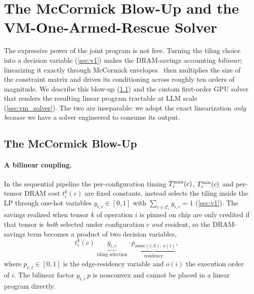 \section{The McCormick Blow-Up and the VM-One-Armed-Rescue Solver}
\label{sec:solver_vm}

The expressive power of the joint program is not free. Turning the tiling
choice into a decision variable (\cref{sec:v1}) makes the DRAM-savings
accounting \emph{bilinear}; linearizing it exactly through McCormick
envelopes~\citep{mccormick1976computability} then multiplies the size of the
constraint matrix and drives its conditioning across roughly ten orders of
magnitude. We describe this blow-up (\cref{sec:mccormick_blowup}) and the
custom first-order GPU solver that renders the resulting linear program
tractable at LLM scale (\cref{sec:vm_solver}). The two are inseparable: we
adopt the exact linearization \emph{only because} we have a solver engineered
to consume its output.

\subsection{The McCormick Blow-Up}
\label{sec:mccormick_blowup}

\paragraph{A bilinear coupling.}
In the sequential pipeline the per-configuration timing $T^{\max}_i(c)$,
$T^{\min}_i(c)$ and per-tensor DRAM cost $t_i^k(c)$ are fixed constants. \Vone{}
instead selects the tiling inside the LP through one-hot variables
$y_{i,c}\in[0,1]$ with $\sum_{c\in\mathcal{C}_i} y_{i,c}=1$
(\cref{sec:v1}). The savings realized when tensor $k$ of operation $i$ is
pinned on chip are only credited if that tensor is \emph{both} selected under
configuration $c$ \emph{and} resident, so the DRAM-savings term becomes a
product of two decision variables,
\begin{equation}
\label{eq:bilinear_coupling}
t_i^k(c)\; \underbrace{y_{i,c}}_{\text{tiling selection}}\cdot
\underbrace{p_{\text{assoc}(i,k),\,o(i)}}_{\text{residency}},
\end{equation}
where $p_{e,t}\in[0,1]$ is the edge-residency variable and $o(i)$ the
execution order of $i$. The bilinear factor $y_{i,c}\,p$ is nonconvex and
cannot be placed in a linear program directly.


